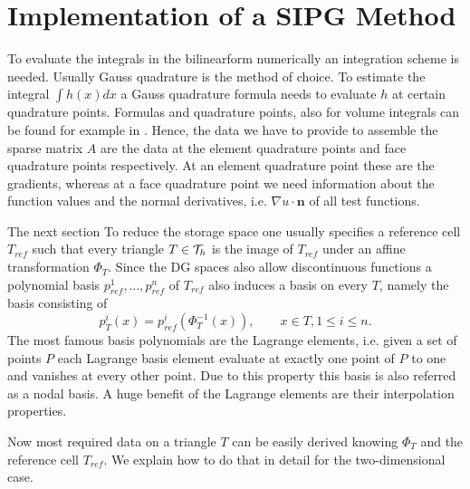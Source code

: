 \section{Implementation of a SIPG Method}
To evaluate the integrals in the bilinearform  numerically an integration scheme is needed. Usually Gauss quadrature is the method of choice. To estimate the integral $\int h(x) dx$ a Gauss quadrature formula needs to evaluate $h$ at certain quadrature points. Formulas and quadrature points, also for volume integrals can be found for example in \cite{Strout1971}.
Hence, the data we have to provide to assemble the sparse matrix $A$ are the data at the element quadrature points and face quadrature points respectively.  
At an element quadrature point these are the gradients, whereas at a face quadrature point we need information about  the function values and the normal derivatives, i.e. $\nabla u \cdot \mathbf{n}$ of all test functions.

The next section 
To reduce the storage space one usually specifies a reference cell $T_{ref}$ such that every triangle $T \in \mathcal{T}_h$ is the image of $T_{ref}$ under an affine transformation $\Phi_T$. 
Since the DG spaces also allow discontinuous functions a polynomial basis $p^1_{ref},\dots,p^n_{ref}$ of $T_{ref}$ also induces a basis on every $T$, namely the basis consisting of 
\[
	p_T^i(x) = p^i_{ref}(\Phi_T^{-1}(x)), \qquad x \in T, 1 \leq i \leq n.
\]
The most famous basis polynomials are the Lagrange elements, i.e. given a set of points $P$ each Lagrange basis element evaluate at exactly one point of $P$ to one and vanishes at every other point. Due to this property this basis is also referred as a nodal basis. 
A huge benefit of the Lagrange elements are their interpolation properties. 

Now most required data on a triangle $T$ can be easily derived knowing $\Phi_T$ and the reference cell $T_{ref}$. We explain how to do that in detail for the two-dimensional case.

